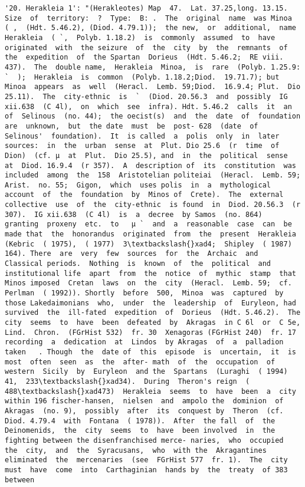 \documentclass[11pt]{article}
\begin{document}
\begin{Verbatim}[commandchars=\\\{\}]
         '20. Herakleia 1': "(Herakleotes) Map  47.  Lat. 37.25,long. 13.15.  Size  of  territory:  ?  Type:  B: .  The  original  name  was Minoa  ( ,  (Hdt. 5.46.2), (Diod. 4.79.1));  the new,  or  additional,  name  Herakleia  ( `,  Polyb. 1.18.2)  is  commonly  assumed  to  have  originated  with  the seizure  of  the  city  by  the  remnants  of  the  expedition  of  the Spartan  Dorieus  (Hdt. 5.46.2;  RE viii.  437).  The  double name,  Herakleia  Minoa,  is  rare  (Polyb. 1.25.9: `  );  Herakleia  is  common  (Polyb. 1.18.2;Diod.  19.71.7); but  Minoa  appears  as  well  (Heracl.  Lemb. 59;Diod.  16.9.4; Plut.  Dio 25.11).  The  city-ethnic  is  `  (Diod. 20.56.3  and  possibly  IG xii.638  (C 4l),  on  which  see  infra). Hdt. 5.46.2  calls  it  an  of  Selinous  (no. 44);  the oecist(s)  and  the  date  of  foundation  are  unknown,  but  the date  must  be  post- 628  (date  of  Selinous'  foundation).  It  is called  a  polis  only  in  later  sources:  in  the  urban  sense  at  Plut. Dio 25.6  (r  time  of  Dion)  (cf. µ  at  Plut.  Dio 25.5), and  in  the  political  sense  at  Diod. 16.9.4  (r 357).  A  description of  its  constitution  was  included  among  the  158  Aristotelian politeiai  (Heracl.  Lemb. 59;  Arist.  no. 55;  Gigon,  which  uses polis  in  a  mythological  account  of  the  foundation  by  Minos of  Crete).  The  external  collective  use  of  the  city-ethnic  is found  in  Diod. 20.56.3  (r 307).  IG xii.638  (C 4l)  is  a  decree  by Samos  (no. 864)  granting  proxeny  etc.  to   µ `  and  a  reasonable  case  can  be  made that  the  honorandus  originated  from  the  present  Herakleia (Kebric  ( 1975),  ( 1977)  3\textbackslash{}xad4;  Shipley  ( 1987)  164). There  are  very  few  sources  for  the  Archaic  and  Classical periods.  Nothing  is  known  of  the  political  and  institutional life  apart  from  the  notice  of  mythic  stamp  that  Minos imposed  Cretan  laws  on  the  city  (Heracl.  Lemb. 59;  cf. Perlman  ( 1992)). Shortly  before  500,  Minoa  was  captured  by  those Lakedaimonians  who,  under  the  leadership  of  Euryleon, had  survived  the  ill-fated  expedition  of  Dorieus  (Hdt. 5.46.2).  The  city  seems  to  have  been  defeated  by  Akragas  in C 6l  or  C 5e,  Lind.  Chron.  (FGrHist 532)  fr. 30  Xenagoras (FGrHist 240)  fr. 17  recording  a  dedication  at  Lindos  by Akragas  of  a  palladion  taken   . Though  the  date of  this  episode  is  uncertain,  it  is  most  often  seen  as  the  after- math  of  the  occupation  of  western  Sicily  by  Euryleon  and the  Spartans  (Luraghi  ( 1994)  41,  233\textbackslash{}xad34).  During  Theron's reign  ( 488\textbackslash{}xad473)  Herakleia  seems  to  have  been  a  city  within 196 fischer-hansen,  nielsen  and  ampolo the  dominion  of  Akragas  (no. 9),  possibly  after  its  conquest by  Theron  (cf.  Diod. 4.79.4  with  Fontana  ( 1978)).  After  the fall  of  the  Deinomenids,  the  city  seems  to  have  been involved  in  the  fighting between the disenfranchised merce- naries,  who  occupied  the  city,  and  the  Syracusans,  who  with the  Akragantines  eliminated  the  mercenaries  (see  FGrHist 577  fr. 1).  The  city  must  have  come  into  Carthaginian  hands by  the  treaty  of 383  between  
\end{Verbatim}
\end{document}
